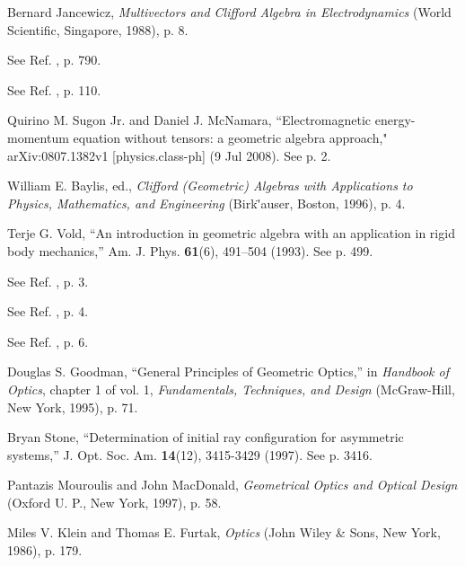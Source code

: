 \documentclass[11pt,twocolumn]{article}
\begin{document}
\begin{thebibliography}{99}
\newpage

Bernard Jancewicz, \textsl{Multivectors and Clifford Algebra in Electrodynamics} (World Scientific, Singapore, 1988), p. 8.

See Ref. \cite{BaylisHuschiltWei_1992_ajpv60i9pp788-797_p789}, p. 790.

See Ref. \cite{Hestenes_2003_ajpv71i2pp104-121_p107}, p. 110.

Quirino M. Sugon Jr. and Daniel J. McNamara, ``Electromagnetic energy-momentum equation without tensors: a geometric algebra approach," arXiv:0807.1382v1 [physics.class-ph] (9 Jul 2008).  See p. 2.

William E. Baylis, ed., \textsl{Clifford (Geometric) Algebras with Applications to Physics, Mathematics, and Engineering} (Birk\"'auser, Boston, 1996), p. 4.

Terje G. Vold, ``An introduction in geometric algebra with an application in rigid body mechanics,'' Am. J. Phys. \textbf{61}(6), 491--504 (1993).  See p. 499.

See Ref. \cite{SugonMcNamara_2008_arXiv0812.0664v1_p8}, p. 3.

See Ref. \cite{SugonMcNamara_2008_arXiv0812.0664v1_p8}, p. 4.

See Ref. \cite{SugonMcNamara_2008_arXiv0812.0664v1_p8}, p. 6.

Douglas S. Goodman, ``General Principles of Geometric Optics,'' in \textsl{Handbook of Optics}, chapter 1 of vol. 1, \textsl{Fundamentals, Techniques, and Design} (McGraw-Hill, New York, 1995), p. 71.


Bryan Stone, ``Determination of initial ray configuration for asymmetric systems,'' J. Opt. Soc. Am. \textbf{14}(12), 3415-3429 (1997).  See p. 3416.

Pantazis Mouroulis and John MacDonald, \textsl{Geometrical Optics and Optical Design} (Oxford U. P., New York, 1997), p. 58.

Miles V. Klein and Thomas E. Furtak, \textsl{Optics} (John Wiley \& Sons, New York, 1986), p. 179.

\end{thebibliography}
\end{document}
